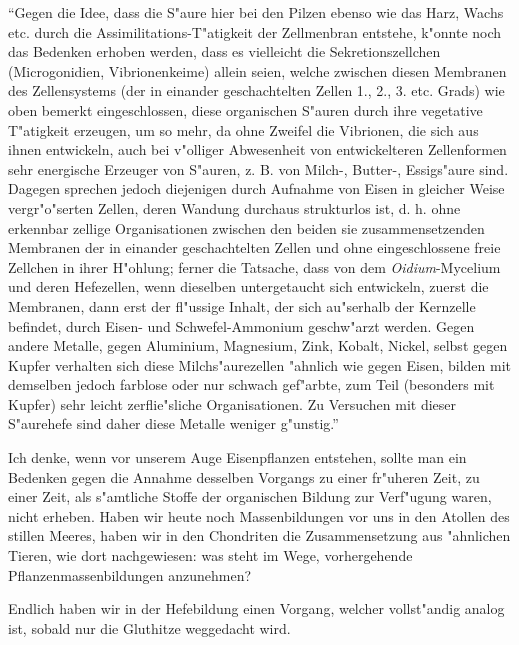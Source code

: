 \documentclass[a4paper, 11pt, oneside]{article}
\begin{document}
"`Gegen die Idee, dass die S"aure hier bei den Pilzen ebenso wie das Harz, Wachs etc. durch die Assimilitations-T"atigkeit der Zellmenbran entstehe, k"onnte noch das Bedenken erhoben werden, dass es vielleicht die Sekretionszellchen (Microgonidien, Vibrionenkeime) allein seien, welche zwischen diesen Membranen des Zellensystems (der in einander geschachtelten Zellen 1., 2., 3. etc. Grads) wie oben bemerkt eingeschlossen, diese organischen S"auren durch ihre vegetative T"atigkeit erzeugen, um so mehr, da ohne Zweifel die Vibrionen, die sich aus ihnen entwickeln, auch bei v"olliger Abwesenheit von entwickelteren Zellenformen sehr energische Erzeuger von S"auren, z. B. von Milch-, Butter-, Essigs"aure sind. Dagegen sprechen jedoch diejenigen durch Aufnahme von Eisen in gleicher Weise vergr"o"serten Zellen, deren Wandung durchaus strukturlos ist, d. h. ohne erkennbar zellige Organisationen zwischen den beiden sie zusammensetzenden Membranen der in einander geschachtelten Zellen und ohne eingeschlossene freie Zellchen in ihrer H"ohlung; ferner die Tatsache, dass von dem \emph{Oidium}-Mycelium und deren Hefezellen, wenn dieselben untergetaucht sich entwickeln, zuerst die Membranen, dann erst der fl"ussige Inhalt, der sich au"serhalb der Kernzelle befindet, durch Eisen- und Schwefel-Ammonium geschw"arzt werden. Gegen andere Metalle, gegen Aluminium, Magnesium, Zink, Kobalt, Nickel, selbst gegen Kupfer verhalten sich diese Milchs"aurezellen "ahnlich wie gegen Eisen, bilden mit demselben jedoch farblose oder nur schwach gef"arbte, zum Teil (besonders mit Kupfer) sehr leicht zerflie"sliche Organisationen. Zu Versuchen mit dieser S"aurehefe sind daher diese Metalle weniger g"unstig."'

Ich denke, wenn vor unserem Auge Eisenpflanzen entstehen, sollte man ein Bedenken gegen die Annahme desselben Vorgangs zu einer fr"uheren Zeit, zu einer Zeit, als s"amtliche Stoffe der organischen Bildung zur Verf"ugung waren, nicht erheben. Haben wir heute noch Massenbildungen vor uns in den Atollen des stillen Meeres, haben wir in den Chondriten die Zusammensetzung aus "ahnlichen Tieren, wie dort nachgewiesen: was steht im Wege, vorhergehende Pflanzenmassenbildungen anzunehmen?

Endlich haben wir in der Hefebildung einen Vorgang, welcher vollst"andig analog ist, sobald nur die Gluthitze weggedacht wird.
\end{document}
